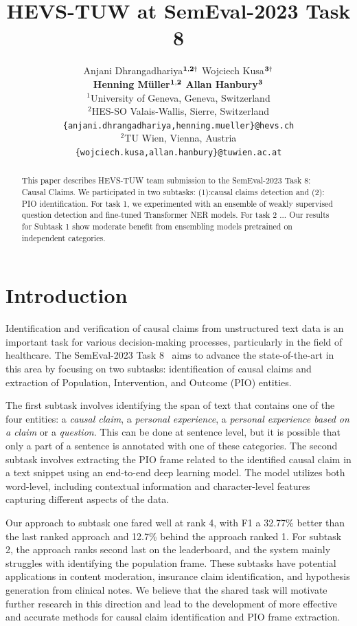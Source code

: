 \documentclass[11pt]{article}
\title{HEVS-TUW at SemEval-2023 Task 8}
\author{Anjani Dhrangadhariya\hspace{1pt}$^{{{\bf 1,2}}\dag}$ \hspace{.7cm} Wojciech Kusa\hspace{1pt}$^{{\bf 3}\dag}$ \\[0.15cm] {\bf Henning Müller\hspace{1pt}$^{{\bf 1,2}}$}  \hspace{.7cm}  {\bf Allan Hanbury\hspace{1pt}$^{{\bf 3}}$}
\\[0.4cm]
{$^1$University of Geneva, Geneva, Switzerland} \\
{$^2$HES-SO Valais-Wallis, Sierre, Switzerland} \\
{\tt \{anjani.dhrangadhariya,henning.mueller\}@hevs.ch} \\
{$^2$TU Wien, Vienna, Austria} \\
{\tt \{wojciech.kusa,allan.hanbury\}@tuwien.ac.at} \\
}
\begin{document}
\maketitle
{\let\thefootnote\relax{}}

\begin{abstract}
This paper describes HEVS-TUW team submission to the SemEval-2023 Task 8: Causal Claims.
We participated in two subtasks: (1):causal claims detection and (2): PIO identification.
For task 1, we experimented with an ensemble of weakly supervised question detection and fine-tuned Transformer NER models.
For task 2 ...
Our results for Subtask 1 show moderate benefit from ensembling models pretrained on independent categories.

\end{abstract}

\section{Introduction}

% 
Identification and verification of causal claims from unstructured text data is an important task for various decision-making processes, particularly in the field of healthcare. The SemEval-2023 Task 8~\cite{CausalClaims} aims to advance the state-of-the-art in this area by focusing on two subtasks: identification of causal claims and extraction of Population, Intervention, and Outcome (PIO) entities.

% 
The first subtask involves identifying the span of text that contains one of the four entities: a \emph{causal claim}, a \emph{personal experience}, a \emph{personal experience based on a claim} or a \emph{question}. 
This can be done at sentence level, but it is possible that only a part of a sentence is annotated with one of these categories. 
The second subtask involves extracting the PIO frame related to the identified causal claim in a text snippet using an end-to-end deep learning model.
The model utilizes both word-level, including contextual information and character-level features capturing different aspects of the data.

Our approach to subtask one fared well at rank 4, with F1 a 32.77\% better than the last ranked approach and 12.7\% behind the approach ranked 1.
For subtask 2, the approach ranks second last on the leaderboard, and the system mainly struggles with identifying the population frame.
These subtasks have potential applications in content moderation, insurance claim identification, and hypothesis generation from clinical notes.
We believe that the shared task will motivate further research in this direction and lead to the development of more effective and accurate methods for causal claim identification and PIO frame extraction.
%
%
%
\end{document}
